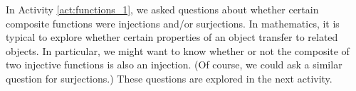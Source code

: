 \begin{comment}

\ActivitySolution

\ba
\item Applying the rules for $f$ and $h$ gives us 
\begin{align*}
(h \circ f)(1) &= h(f(1)) = h(b) = \alpha \\
(h \circ f)(2) &= h(f(2)) =  h(c) = \beta \\
(h \circ f)(3) &= h(f(3)) = h(a) = \gamma.
\end{align*}

\item Applying the rules for $g$ and $h$ gives us
\begin{align*}
(h \circ g)(1) &= h(g(1)) = h(d) = \alpha \\
(h \circ g)(2) &= h(g(2)) = h(c) = \beta \\
(h \circ g)(3) &= h(g(3)) = h(d) = \alpha.
\end{align*}

\item By the definition of $f$, we can see that each element in $B$ has at most one preimage. So $f$ is an injection. The fact that $g(1) = g(3) = d$ shows that $g$ is not an injection. Similarly, $h(a) = h(d) = \alpha$, so $h$ is not an injection. 

The element $d$ in $B$ has no preimage in $A$ under $f$, so $f$ is not a surjection. Similarly, the element $a$ in $B$ has no preimage under $g$, so $g$ isn't a surjection. Each element in $C$ has at least one preimage in $B$ under $h$, so $h$ is a surjection. 


\item Since $(h \circ f)(x)$ is always different than $(h \circ f)(y)$ when $x \neq y$, we see that $h \circ f$ is an injection. We can also see by inspection that the images of the elements in $A$ under $h \circ f$ produce all of the elements of $C$, so $h \circ f$ is a surjection.

\item Since $(h \circ g)(1) = \alpha = (h \circ g)(3)$, we see that $h \circ g$ is not an injection. It is also the case there there is no input to $h \circ g$ that produces the output $\gamma$, so $h \circ g$ is not a surjection.

\ea

\end{comment}

In Activity \ref{act:functions_1}, we asked questions about whether certain composite functions were injections and/or surjections. In mathematics, it is typical to explore whether certain properties of an object transfer to related objects. In particular, we might want to know whether or not the composite of two injective functions is also an injection. (Of course, we could ask a similar question for surjections.)  These questions are explored in the next activity.

